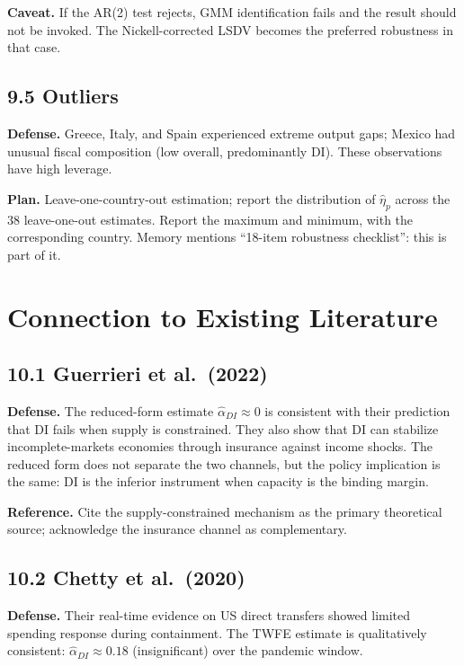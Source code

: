 \documentclass[11pt,a4paper]{article}
\begin{document}
\textbf{Caveat.} If the AR(2) test rejects, GMM identification fails and the result should not be invoked. The Nickell-corrected LSDV becomes the preferred robustness in that case.

\subsection*{9.5 Outliers}

\textbf{Defense.} Greece, Italy, and Spain experienced extreme output gaps; Mexico had unusual fiscal composition (low overall, predominantly DI). These observations have high leverage.

\textbf{Plan.} Leave-one-country-out estimation; report the distribution of $\hat\eta_p$ across the 38 leave-one-out estimates. Report the maximum and minimum, with the corresponding country. Memory mentions ``18-item robustness checklist'': this is part of it.

\section{Connection to Existing Literature}

\subsection*{10.1 Guerrieri et al.\ (2022)}

\textbf{Defense.} The reduced-form estimate $\hat\alpha_{DI} \approx 0$ is consistent with their prediction that DI fails when supply is constrained. They also show that DI can stabilize incomplete-markets economies through insurance against income shocks. The reduced form does not separate the two channels, but the policy implication is the same: DI is the inferior instrument when capacity is the binding margin.

\textbf{Reference.} Cite the supply-constrained mechanism as the primary theoretical source; acknowledge the insurance channel as complementary.

\subsection*{10.2 Chetty et al.\ (2020)}

\textbf{Defense.} Their real-time evidence on US direct transfers showed limited spending response during containment. The TWFE estimate is qualitatively consistent: $\hat\alpha_{DI} \approx 0.18$ (insignificant) over the pandemic window.
\end{document}
